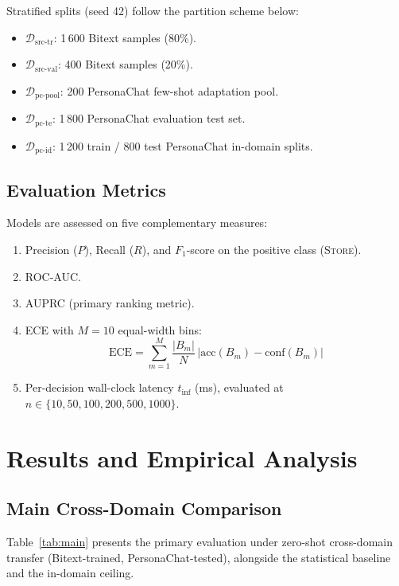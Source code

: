 \documentclass[conference]{IEEEtran}
\begin{document}
Stratified splits (seed 42) follow the partition scheme below:
\begin{itemize}
  \item $\mathcal{D}_{\mathrm{src\text{-}tr}}$: 1\,600 Bitext samples (80\%).
  \item $\mathcal{D}_{\mathrm{src\text{-}val}}$: 400 Bitext samples (20\%).
  \item $\mathcal{D}_{\mathrm{pc\text{-}pool}}$: 200 PersonaChat few-shot adaptation pool.
  \item $\mathcal{D}_{\mathrm{pc\text{-}te}}$: 1\,800 PersonaChat evaluation test set.
  \item $\mathcal{D}_{\mathrm{pc\text{-}id}}$: 1\,200 train / 800 test PersonaChat in-domain splits.
\end{itemize}

\subsection{Evaluation Metrics}
Models are assessed on five complementary measures:
\begin{enumerate}
  \item Precision ($P$), Recall ($R$), and $F_1$-score on the
    positive class (\textsc{Store}).
  \item ROC-AUC.
  \item AUPRC (primary ranking metric).
  \item ECE with $M{=}10$ equal-width bins:
    \begin{equation}
      \mathrm{ECE} = \sum_{m=1}^{M}
        \frac{|B_m|}{N}\,
        \bigl|\mathrm{acc}(B_m) - \mathrm{conf}(B_m)\bigr|
    \end{equation}
  \item Per-decision wall-clock latency $t_{\inf}$ (ms),
    evaluated at
    $n \in \{10, 50, 100, 200, 500, 1000\}$.
\end{enumerate}

\section{Results and Empirical Analysis}

\subsection{Main Cross-Domain Comparison}
Table~\ref{tab:main} presents the primary evaluation under
zero-shot cross-domain transfer (Bitext-trained, PersonaChat-tested),
alongside the statistical baseline and the in-domain ceiling.
\end{document}
